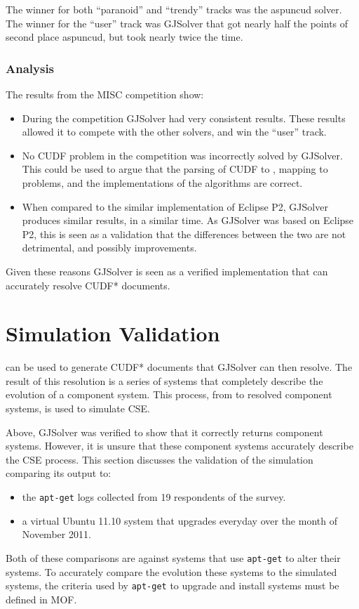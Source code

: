 The winner for both ``paranoid'' and ``trendy'' tracks was the aspuncud solver.
The winner for the ``user'' track was GJSolver that got nearly half the points of second place aspuncud, but took nearly twice the time.

\subsubsection{Analysis}
The results from the MISC competition show:
\begin{itemize}
  \item During the competition GJSolver had very consistent results.
These results allowed it to compete with the other solvers, and win the ``user'' track.
 \item No CUDF problem in the competition was incorrectly solved by GJSolver. 
 This could be used to argue that the parsing of CUDF to \modelname, mapping to \modelimpl problems, and the implementations of the algorithms are correct.
 \item When compared to the similar implementation of Eclipse P2, GJSolver produces similar results, in a similar time. 
 As GJSolver was based on Eclipse P2, this is seen as a validation that the differences between the two are not detrimental, and possibly improvements. 
\end{itemize}

Given these reasons GJSolver is seen as a verified implementation that can accurately resolve CUDF* documents.

\section{Simulation Validation}
\label{impl.validation}
\usermodel can be used to generate CUDF* documents that GJSolver can then resolve.
The result of this resolution is a series of systems that completely describe the evolution of a component system.
This process, from \usermodel to resolved component systems, is used to simulate CSE.

Above, GJSolver was verified to show that it correctly returns component systems.
However, it is unsure that these component systems accurately describe the CSE process.
This section discusses the validation of the simulation comparing its output to:
\begin{itemize}
  \item the \texttt{apt-get} logs collected from 19 respondents of the survey.
  \item a virtual Ubuntu 11.10 system that upgrades everyday over the month of November 2011.
\end{itemize}
Both of these comparisons are against systems that use \texttt{apt-get} to alter their systems.
To accurately compare the evolution these systems to the simulated systems, the criteria used by \texttt{apt-get} to upgrade and install systems must be defined in MOF.

